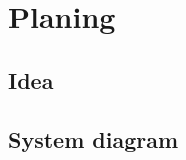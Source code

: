 \documentclass[10pt,a4paper]{book}
\begin{document}
{}
\tableofcontents
\newpage
{}

\chapter{Planing}
\section{Idea}
\section{System diagram}

\end{document}
